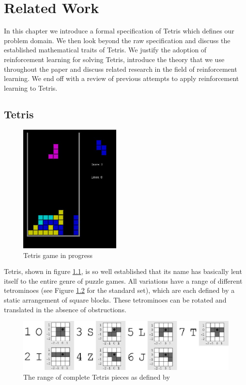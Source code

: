 \documentclass{rucsthesis}
\begin{document}
\chapter{Related Work}

In this chapter we introduce a formal specification of Tetris which defines our problem domain. We then look beyond the raw specification and discuss the established mathematical traits of Tetris. We justify the adoption of reinforcement learning for solving Tetris, introduce the theory that we use throughout the paper and discuss related research in the field of reinforcement learning. We end off with a review of previous attempts to apply reinforcement learning to Tetris.

\section{Tetris}

\begin{figure}[h]
\centering%
\includegraphics[width=2in]{tetgame.jpg}
\caption{Tetris game in progress}
\label{fig:tetgame}
\end{figure}

Tetris, shown in figure \ref{fig:tetgame}, is so well established that its name has basically lent itself to the entire genre of puzzle games. All variations have a range of different tetrominoes (see Figure \ref{fig:pieces} for the standard set), which are each defined by a static arrangement of square blocks. These tetrominoes can be rotated and translated in the absence of obstructions. 

\begin{figure}[h]
\centering
\includegraphics[width=\textwidth]{tetrisblocks.jpg}
\caption{The range of complete Tetris pieces as defined by \cite{tetstand}}
\label{fig:pieces}
\end{figure}
 
\end{document}
